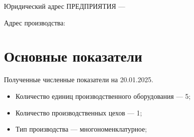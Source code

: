 Юридический адрес ПРЕДПРИЯТИЯ --- \CURADDRESS

Адрес производства: \ADDRESS



\section{Основные показатели}

Полученные численные показатели на 20.01.2025.

\begin{itemize}

\item Количество единиц производственного оборудования --- 5;
\item Количество производственных цехов --- 1;
\item Тип производства --- многономенклатурное;




\end{itemize}












% 